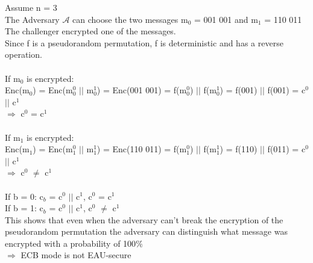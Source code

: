 Assume n = 3 \\
The Adversary  \(\mathcal{A}\) can choose the two messages m\(_{0}\)  = 001 001 and  m\(_{1}\)  = 110 011 \\
The challenger encrypted one of the messages. \\
Since f is a pseudorandom permutation, f is deterministic and has a reverse operation. \\
\\
If m\(_{0}\)  is encrypted: \\
\>Enc(m\(_{0}\)) = Enc(m\(_{0}^{0}\) \(\vert \vert\) m\(_{0}^{1}\)) = Enc(001 001) = f(m\(_{0}^{0}\)) \(\vert \vert\) f(m\(_{0}^{1}\)) =
f(001) \(\vert \vert\) f(001) = c\(^{0}\) \(\vert \vert\) c\(^{1}\) \\
\>\(\Rightarrow\) c\(^{0}\) = c\(^{1}\) \\
\\
If m\(_{1}\)  is encrypted: \\
\>Enc(m\(_{1}\)) = Enc(m\(_{1}^{0}\) \(\vert \vert\) m\(_{1}^{1}\)) = Enc(110 011) = f(m\(_{1}^{0}\)) \(\vert \vert\) f(m\(_{1}^{1}\)) =
f(110) \(\vert \vert\) f(011) = c\(^{0}\) \(\vert \vert\) c\(^{1}\) \\
\>\(\Rightarrow\) c\(^{0}\) \(\neq\) c\(^{1}\) \\
\\
If b = 0: c\(_{b}\) = c\(^{0}\) \(\vert \vert\) c\(^{1}\), c\(^{0}\) = c\(^{1}\) \\
If b = 1: c\(_{b}\) = c\(^{0}\) \(\vert \vert\) c\(^{1}\), c\(^{0}\) \(\neq\) c\(^{1}\) \\
This shows that even when the adversary can't break the encryption of the pseudorandom permutation the adversary can distinguish what message was encrypted with a probability of 100\(\%\) \\
\(\Rightarrow\) ECB mode is not EAU-secure \\
  